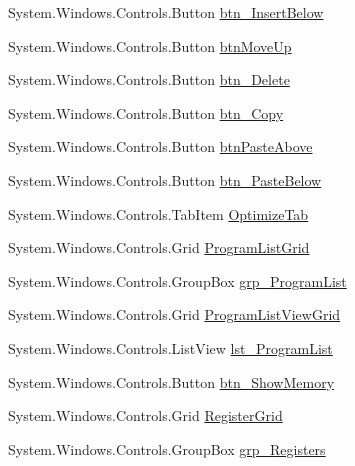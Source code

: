 \begin{DoxyCompactItemize}
System.\+Windows.\+Controls.\+Button \hyperlink{class_c_p_u___o_s___simulator_1_1_main_window_a7c6c417d0bd3af11e77f86cf2cfb03fe}{btn\+\_\+\+Insert\+Below}
\item 
System.\+Windows.\+Controls.\+Button \hyperlink{class_c_p_u___o_s___simulator_1_1_main_window_aa85d9301fed773f44a352aad64a9d80d}{btn\+Move\+Up}
\item 
System.\+Windows.\+Controls.\+Button \hyperlink{class_c_p_u___o_s___simulator_1_1_main_window_a74623b1e8f8ab1b3b6835bda2e8a9256}{btn\+\_\+\+Delete}
\item 
System.\+Windows.\+Controls.\+Button \hyperlink{class_c_p_u___o_s___simulator_1_1_main_window_a55b2516a7b78d0e79deac7f1a79f3a92}{btn\+\_\+\+Copy}
\item 
System.\+Windows.\+Controls.\+Button \hyperlink{class_c_p_u___o_s___simulator_1_1_main_window_ae2ef9b73d0b5776415c7f3e91c1eaf21}{btn\+Paste\+Above}
\item 
System.\+Windows.\+Controls.\+Button \hyperlink{class_c_p_u___o_s___simulator_1_1_main_window_a1c24521ff648d75bf5991567e1a85b55}{btn\+\_\+\+Paste\+Below}
\item 
System.\+Windows.\+Controls.\+Tab\+Item \hyperlink{class_c_p_u___o_s___simulator_1_1_main_window_a47b1359d9e96abf2b0935eb3392405d4}{Optimize\+Tab}
\item 
System.\+Windows.\+Controls.\+Grid \hyperlink{class_c_p_u___o_s___simulator_1_1_main_window_adb8397cdbc794d18b0379ba7251d2278}{Program\+List\+Grid}
\item 
System.\+Windows.\+Controls.\+Group\+Box \hyperlink{class_c_p_u___o_s___simulator_1_1_main_window_a0ccd227c10c9a0878095ef10c0ff92b7}{grp\+\_\+\+Program\+List}
\item 
System.\+Windows.\+Controls.\+Grid \hyperlink{class_c_p_u___o_s___simulator_1_1_main_window_a4e287cef9f0becaebe0777af8de2d8c9}{Program\+List\+View\+Grid}
\item 
System.\+Windows.\+Controls.\+List\+View \hyperlink{class_c_p_u___o_s___simulator_1_1_main_window_ab33f21e0f19eab104e6f67f44d89daeb}{lst\+\_\+\+Program\+List}
\item 
System.\+Windows.\+Controls.\+Button \hyperlink{class_c_p_u___o_s___simulator_1_1_main_window_af2d1c3293ffaa1d203a9bdb8bf282eab}{btn\+\_\+\+Show\+Memory}
\item 
System.\+Windows.\+Controls.\+Grid \hyperlink{class_c_p_u___o_s___simulator_1_1_main_window_a37acb139db0aa54950350fdb47dfd452}{Register\+Grid}
\item 
System.\+Windows.\+Controls.\+Group\+Box \hyperlink{class_c_p_u___o_s___simulator_1_1_main_window_af858add509dfe2b90f0d356822f73737}{grp\+\_\+\+Registers}

\end{DoxyCompactItemize}
